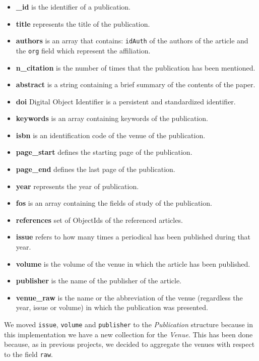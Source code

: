 \documentclass{Configuration_Files/PoliMi3i_thesis}
\begin{document}
\begin{itemize}
    \item \textbf{\_id} is the identifier of a publication.
    \item \textbf{title} represents the title of the publication.
    \item \textbf{authors} is an array that contains: \verb |idAuth| of the authors of the article and the \verb |org|
        field which represent the affiliation.
    \item \textbf{n\_citation} is the number of times that the publication has been mentioned.
    \item \textbf{abstract} is a string containing a brief summary of the contents of the paper.
    \item \textbf{doi} Digital Object Identifier is a persistent and standardized identifier.
    \item \textbf{keywords} is an array containing keywords of the publication.
    \item \textbf{isbn} is an identification code of the venue of the publication.
    \item \textbf{page\_start} defines the starting page of the publication.
    \item \textbf{page\_end} defines the last page of the publication.
    \item \textbf{year} represents the year of publication.
    \item \textbf{fos} is an array containing the fields of study of the publication.
    \item \textbf{references} set of ObjectIds of the referenced articles.
    \item \textbf{issue} refers to how many times a periodical has been published during that year.
    \item \textbf{volume} is the volume of the venue in which the article has been published.
    \item \textbf{publisher} is the name of the publisher of the article.
    \item \textbf{venue\_raw} is the name or the abbreviation of the venue (regardless the year, issue or volume) in which the
        publication was presented.
\end{itemize}
We moved \verb|issue|, \verb|volume| and \verb|publisher| to the \emph{Publication} structure because in this implementation we have a new 		       collection for the \emph{Venue}. This has been done because, as in previous projects, we decided to aggregate the venues with respect to the field \verb|raw|.
\end{document}
